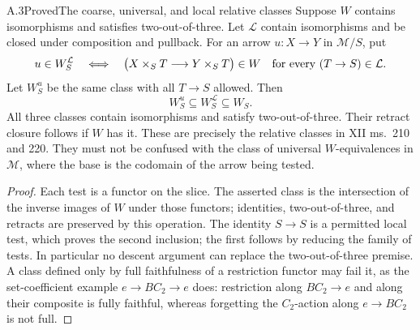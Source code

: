 \begin{claim}{A.3}{Proved}{The coarse, universal, and local relative classes}
Suppose $W$ contains isomorphisms and satisfies two-out-of-three. Let $\mathcal L$ contain isomorphisms and be closed under composition and pullback. For an arrow $u:X\to Y$ in $\mathcal M/S$, put
\[
u\in W_S^{\mathcal L}\quad\Longleftrightarrow\quad
\bigl(X\times_S T\longrightarrow Y\times_S T\bigr)\in W
\quad\hbox{for every }(T\to S)\in\mathcal L.
\]
Let $W_S^u$ be the same class with all $T\to S$ allowed. Then
\[
W_S^u\subseteq W_S^{\mathcal L}\subseteq W_S.
\]
All three classes contain isomorphisms and satisfy two-out-of-three. Their retract closure follows if $W$ has it. These are precisely the relative classes in XII ms.~210 and 220. They must not be confused with the class of universal $W$-equivalences in $\mathcal M$, where the base is the codomain of the arrow being tested.
\end{claim}
\begin{proof}
Each test is a functor on the slice. The asserted class is the intersection of the inverse images of $W$ under those functors; identities, two-out-of-three, and retracts are preserved by this operation. The identity $S\to S$ is a permitted local test, which proves the second inclusion; the first follows by reducing the family of tests. In particular no descent argument can replace the two-out-of-three premise. A class defined only by full faithfulness of a restriction functor may fail it, as the set-coefficient example $e\to BC_2\to e$ does: restriction along $BC_2\to e$ and along their composite is fully faithful, whereas forgetting the $C_2$-action along $e\to BC_2$ is not full.
\end{proof}

